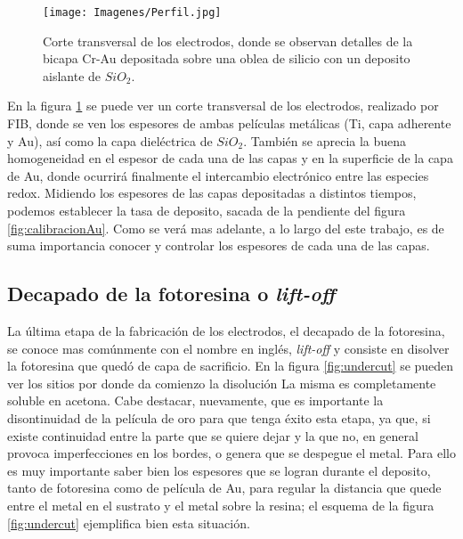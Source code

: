 						  \begin{figure}[ht!]
						  \begin{center}
						  \texttt{[image: Imagenes/Perfil.jpg]}
						  \caption[Sección trasversal de los eletrodos]{Corte transversal de los electrodos, donde se observan detalles de la bicapa Cr-Au depositada sobre una oblea de silicio con un deposito aislante de $SiO_2$.}
						  \label{fig:FIB_electrodos}
						  \end{center}
						  \end{figure} 		
					
	 
		 En la figura \ref{fig:FIB_electrodos} se puede ver un corte transversal de los electrodos, realizado por FIB, donde se ven los espesores de ambas películas metálicas (Ti, capa adherente y Au), así como la capa dieléctrica de $SiO_2$. También se aprecia la buena homogeneidad en el espesor de cada una de las capas y en la superficie de la capa de Au, donde ocurrirá finalmente el intercambio electrónico entre las especies redox. Midiendo los espesores de las capas depositadas a distintos tiempos, podemos establecer la tasa de deposito, sacada de la pendiente del figura \ref{fig:calibracionAu}. Como se verá mas adelante, a lo largo del este trabajo, es de suma importancia conocer y controlar los espesores de cada una de las capas.
						
  		\subsection{Decapado de la fotoresina o\textit{ lift-off}}


		 La última etapa de la fabricación de los electrodos, el decapado de la fotoresina, se conoce mas comúnmente con el nombre en inglés, \textit{lift-off} y consiste en disolver la fotoresina que quedó de capa de sacrificio. En la figura \ref{fig:undercut} se pueden ver los sitios por donde da comienzo la disolución La misma es completamente soluble en acetona. Cabe destacar, nuevamente, que es importante la disontinuidad de la película de oro para que tenga éxito esta etapa, ya que, si existe continuidad entre la parte que se quiere dejar y la que no, en general provoca imperfecciones en los bordes, o genera que se despegue el metal. Para ello es muy importante saber bien los espesores que se logran durante el deposito, tanto de fotoresina como de película de Au, para regular la distancia que quede entre el metal en el sustrato y el metal sobre la resina; el esquema de la figura \ref{fig:undercut} ejemplifica bien esta situación.

